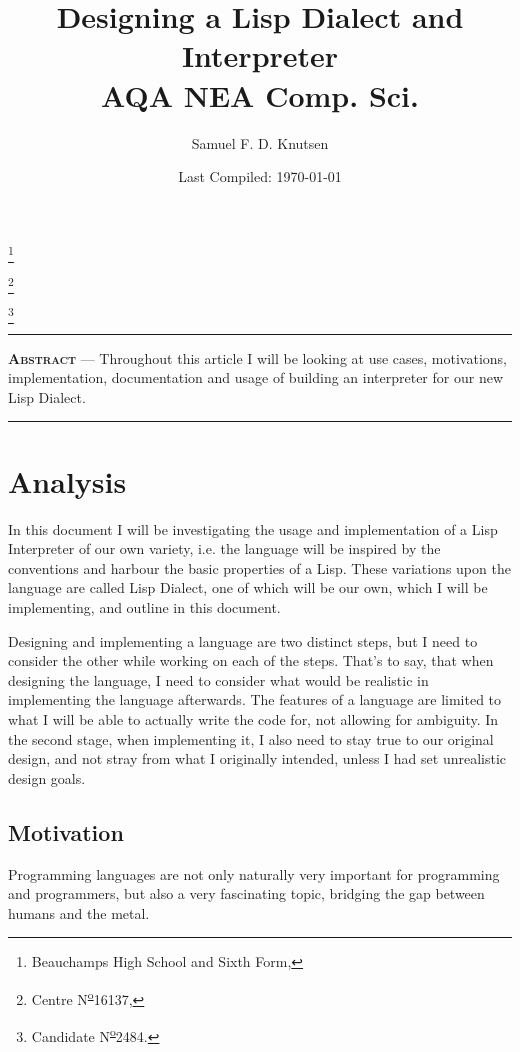 \documentclass{article}
\renewenvironment{abstract}{
\begin{minipage}{0.95\textwidth}
  \rule{\textwidth}{1pt}}
  {\par\noindent\rule{\textwidth}{1pt}
\end{minipage}}
\newcommand{\super}{\textsuperscript}
\newcommand{\numero}{N\super{\underline{o}}}
\newcommand\blfootnote[1]{%
  \begingroup
  \renewcommand\thefootnote{}\footnote{#1}%
  \addtocounter{footnote}{-1}%
  \endgroup
}
\begin{document}

  \title{Designing a Lisp Dialect and Interpreter\\AQA NEA Comp. Sci.}
  \author{Samuel F. D. Knutsen}
  \date{Last Compiled: \today}
  \maketitle
  \blfootnote{Beauchamps High School and Sixth Form,}
  \blfootnote{Centre \numero 16137,}
  \blfootnote{Candidate \numero 2484.}
  \clearpage

  \tableofcontents
  \clearpage

  \setlength{\parindent}{2em}
  \setlength{\parskip}{0.75em}

  \begin{abstract}
    \textsc{\textbf{Abstract}} ---
    Throughout this article I will be looking at use cases, motivations,
    implementation, documentation and usage of building an interpreter for
    our new Lisp Dialect.
    \vspace{-5pt}
  \end{abstract}

\section{Analysis}
  In this document I will be investigating the usage and implementation of
  a Lisp Interpreter of our own variety, i.e. the language will be inspired
  by the conventions and harbour the basic properties of a Lisp. These
  variations upon the language are called Lisp Dialect, one of which will be
  our own, which I will be implementing, and outline in this document.

  Designing and implementing a language are two distinct steps, but I need
  to consider the other while working on each of the steps. That's to say, that
  when designing the language, I need to consider what would be realistic in
  implementing the language afterwards. The features of a language are
  limited to what I will be able to actually write the code for, not
  allowing for ambiguity.  In the second stage, when implementing it, I also
  need to stay true to our original design, and not stray from what I
  originally intended, unless I had set unrealistic design goals.

  \subsection{Motivation}
    Programming languages are not only naturally very important for programming
    and programmers, but also a very fascinating topic, bridging the gap between
    humans and the metal.
\end{document}
